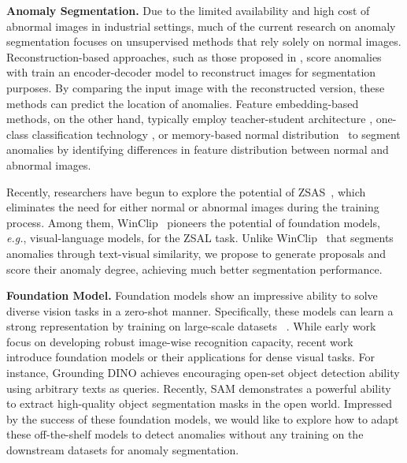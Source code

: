 \noindent\textbf{Anomaly Segmentation. } Due to the limited availability and high cost of abnormal images in industrial settings, much of the current research on anomaly segmentation focuses on unsupervised methods that rely solely on normal images. Reconstruction-based approaches, such as those proposed in \cite{zhou2020encoding,hou2021divide,zavrtanik2021draem,matsubara2020deep,yan2021learning,jiang2022masked}, score anomalies with 
train an encoder-decoder model to reconstruct images for segmentation purposes. By comparing the input image with the reconstructed version, these methods can predict the location of anomalies. Feature embedding-based methods, on the other hand, typically employ teacher-student architecture \cite{salehi2021multiresolution,wang2021student,deng2022anomaly,cao2022informative, cao2022semikd, wan_unsupervised_2022, wan_position_2022, cao_collaborative_2023}, one-class classification technology \cite{yi2020patch,massoli2021mocca,sohn2020learning}, or memory-based normal distribution~\cite{roth2022towards, wan_industrial_2022, cao2023complementary} to segment anomalies by identifying differences in feature distribution between normal and abnormal images. 

Recently, researchers have begun to explore the potential of ZSAS~\cite{nagy2022zero,liu2021zero,rivera2020anomaly,aota2023zero}, which eliminates the need for either normal or abnormal images during the training process. Among them, WinClip~\cite{jeong2023winclip} pioneers the potential of foundation models, \textit{e.g.}, visual-language models, for the ZSAL task. Unlike WinClip~\cite{jeong2023winclip} that segments anomalies through text-visual similarity, we propose to generate proposals and score their anomaly degree, achieving much better segmentation performance.

\noindent\textbf{Foundation Model.} 
Foundation models show an impressive ability to solve diverse vision tasks in a zero-shot manner. Specifically, these models can learn a strong representation by training on large-scale datasets ~\cite{Laion400}. While early work~\cite{radford2021learning,li2021align} focus on developing robust image-wise recognition capacity, recent work~\cite{lu2022unified,wang2022unifying, rao2022denseclip,zhong2022regionclip,zhou2021denseclip,liu2023grounding} introduce foundation models or their applications for dense visual tasks. For instance, Grounding DINO \cite{liu2023grounding} achieves encouraging open-set object detection ability using arbitrary texts as queries. Recently, SAM \cite{kirillov2023segment} demonstrates a powerful ability to extract high-quality object segmentation masks in the open world. Impressed by the success of these foundation models, we would like to explore how to adapt these off-the-shelf models to detect anomalies without any training on the downstream datasets for anomaly segmentation.


